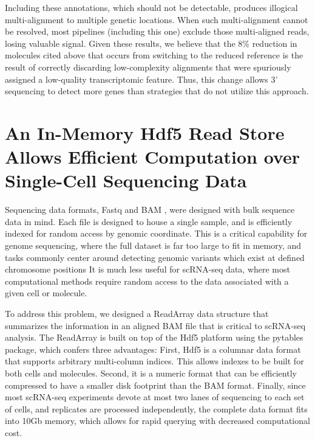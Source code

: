 Including these annotations, which should not be detectable, produces illogical multi-alignment to multiple genetic locations. 
When such multi-alignment cannot be resolved, most pipelines (including this one) exclude those multi-aligned reads, losing valuable signal. 
Given these results, we believe that the 8\% reduction in molecules cited above that occurs from switching to the reduced reference is the result of correctly discarding low-complexity alignments that were spuriously assigned a low-quality transcriptomic feature.
Thus, this change allows 3' sequencing to detect more genes than strategies that do not utilize this approach.  

\section{An In-Memory Hdf5 Read Store Allows Efficient Computation over Single-Cell Sequencing Data} 

Sequencing data formats, Fastq \citep{Cock2009} and BAM \citep{Li2009}, were designed with bulk sequence data in mind.
Each file is designed to house a single sample, and is efficiently indexed for random access by genomic coordinate. 
This is a critical capability for genome sequencing, where the full dataset is far too large to fit in memory, and tasks commonly center around detecting genomic variants which exist at defined chromosome positions \citep{McKenna2010}
It is much less useful for scRNA-seq data, where most computational methods require random access to the data associated with a given cell or molecule. 

To address this problem, we designed a ReadArray data structure that summarizes the information in an aligned BAM file that is critical to scRNA-seq analysis. 
The ReadArray is built on top of the {\mono Hdf5} platform \citep{hdf5} using the {\mono pytables} package, which confers three advantages: 
First, Hdf5 is a columnar data format that supports arbitrary multi-column indices. 
This allows indexes to be built for both cells and molecules. 
Second, it is a numeric format that can be efficiently compressed \citep{Alted2010} to have a smaller disk footprint than the BAM format. 
Finally, since most scRNA-seq experiments devote at most two lanes of sequencing to each set of cells, and replicates are processed independently, the complete data format fits into 10Gb memory, which allows for rapid querying with decreased computational cost. 

